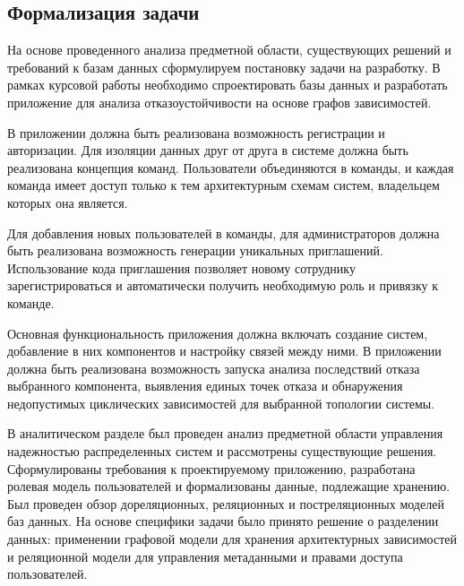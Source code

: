 \subsection{Формализация задачи}
На основе проведенного анализа предметной области, существующих решений и
требований к базам данных сформулируем постановку задачи на разработку. В
рамках курсовой работы необходимо спроектировать базы данных и разработать
приложение для анализа отказоустойчивости на основе графов зависимостей.

В приложении должна быть реализована возможность регистрации и авторизации. Для
изоляции данных друг от друга в системе должна быть реализована концепция
команд. Пользователи объединяются в команды, и каждая команда имеет доступ
только к тем архитектурным схемам систем, владельцем которых она является.

Для добавления новых пользователей в команды, для администраторов должна быть
реализована возможность генерации уникальных приглашений. Использование кода
приглашения позволяет новому сотруднику зарегистрироваться и автоматически
получить необходимую роль и привязку к команде.

Основная функциональность приложения должна включать создание систем,
добавление в них компонентов и настройку связей между ними. В приложении должна
быть реализована возможность запуска анализа последствий отказа выбранного
компонента, выявления единых точек отказа и обнаружения недопустимых
циклических зависимостей для выбранной топологии системы.

В аналитическом разделе был проведен анализ предметной области управления
надежностью распределенных систем и рассмотрены существующие решения.
Сформулированы требования к проектируемому приложению, разработана ролевая
модель пользователей и формализованы данные, подлежащие хранению. Был проведен
обзор дореляционных, реляционных и постреляционных моделей баз данных. На
основе специфики задачи было принято решение о разделении данных: применении
графовой модели для хранения архитектурных зависимостей и реляционной модели
для управления метаданными и правами доступа пользователей.

